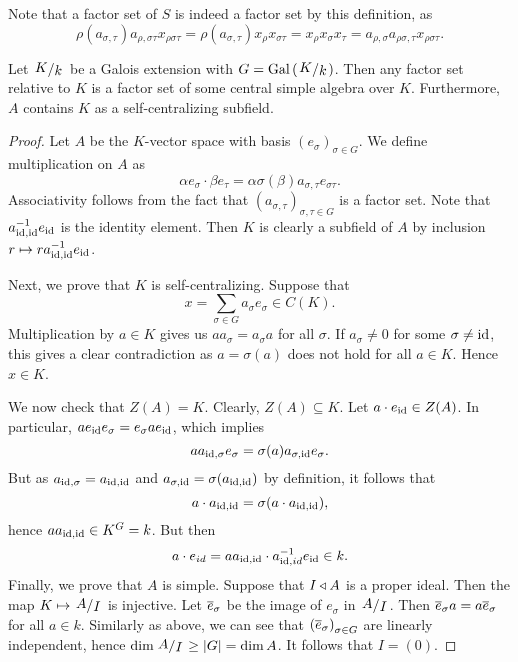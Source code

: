 \begin{opomba}
Note that a factor set of $S$ is indeed a factor set by this
definition, as
\[
\rho(a_{\sigma, \tau}) a_{\rho, \sigma \tau} x_{\rho \sigma \tau} =
\rho(a_{\sigma, \tau}) x_\rho x_{\sigma \tau} =
x_\rho x_\sigma x_\tau =
a_{\rho, \sigma} a_{\rho \sigma, \tau} x_{\rho \sigma \tau}.
\]
\end{opomba}

\begin{trditev}
Let $\kvoc{K}{k}$ be a Galois extension with
$G = \Gal \br{\kvoc{K}{k}}$. Then any factor set relative to $K$ is
a factor set of some central simple algebra over $K$. Furthermore,
$A$ contains $K$ as a self-centralizing subfield.
\end{trditev}

\begin{proof}
Let $A$ be the $K$-vector space with basis
$(e_\sigma)_{\sigma \in G}$. We define multiplication on $A$ as
\[
\alpha e_\sigma \cdot \beta e_\tau =
\alpha \sigma(\beta) a_{\sigma, \tau} e_{\sigma \tau}.
\]
Associativity follows from the fact that
$(a_{\sigma, \tau})_{\sigma, \tau \in G}$ is a factor set. Note
that $a_{\operatorname{id}, \operatorname{id}}^{-1} e_{\operatorname{id}}$ is the identity element. Then $K$
is clearly a subfield of $A$ by inclusion
$r \mapsto r a_{\operatorname{id}, \operatorname{id}}^{-1} e_{\operatorname{id}}$.

Next, we prove that $K$ is self-centralizing. Suppose that
\[
x = \sum_{\sigma \in G} a_\sigma e_\sigma \in C(K).
\]
Multiplication by $a \in K$ gives us $a a_\sigma = a_\sigma a$ for
all $\sigma$. If $a_\sigma \ne 0$ for some $\sigma \ne \operatorname{id}$, this
gives a clear contradiction as $a = \sigma(a)$ does not hold for
all $a \in K$. Hence $x \in K$.

We now check that $Z(A) = K$. Clearly, $Z(A) \subseteq K$. Let
$a \cdot e_{\operatorname{id}} \in Z(A)$. In particular,
$a e_{\operatorname{id}} e_\sigma = e_\sigma a e_{\operatorname{id}}$, which implies
\[
a a_{\operatorname{id}, \sigma} e_\sigma = \sigma(a) a_{\sigma, \operatorname{id}} e_\sigma.
\]
But as $a_{\operatorname{id}, \sigma} = a_{\operatorname{id}, \operatorname{id}}$ and
$a_{\sigma, \operatorname{id}} = \sigma(a_{\operatorname{id}, \operatorname{id}})$ by
definition, it follows that
\[
a \cdot a_{\operatorname{id}, \operatorname{id}} = \sigma(a \cdot a_{\operatorname{id}, \operatorname{id}}),
\]
hence $a a_{\operatorname{id}, \operatorname{id}} \in K^G = k$. But then
\[
a \cdot e_{id} =
a a_{\operatorname{id}, \operatorname{id}} \cdot a_{\operatorname{id}, id}^{-1} e_{\operatorname{id}} \in k.
\]
Finally, we prove that $A$ is simple. Suppose that $I \triangleleft A$ is
a proper ideal. Then the map $K \mapsto \kvoc{A}{I}$ is injective.
Let $\overline{e}_\sigma$ be the image of $e_\sigma$ in $\kvoc{A}{I}$.
Then $\overline{e}_\sigma a = a \overline{e}_\sigma$ for all $a \in k$.
Similarly as above, we can see that
$\left(\overline{e}_\sigma\right)_{\sigma \in G}$ are linearly independent,
hence $\dim \kvoc{A}{I} \geq \abs{G} = \dim A$. It follows that
$I = (0)$.
\end{proof}

